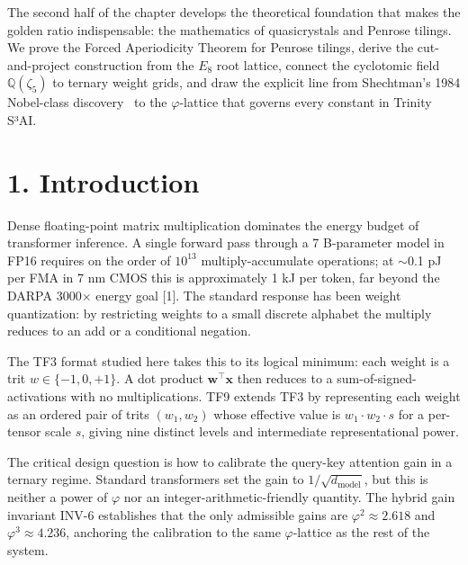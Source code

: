 The second half of the chapter develops the
theoretical foundation that makes the golden
ratio indispensable: the mathematics of
quasicrystals and Penrose tilings. We prove the
Forced Aperiodicity Theorem for Penrose tilings,
derive the cut-and-project construction from the
\(E_8\) root lattice, connect the cyclotomic
field \(\mathbb{Q}(\zeta_5)\) to ternary weight
grids, and draw the explicit line from Shechtman's
1984 Nobel-class discovery~\cite{shechtman1984}
to the \(\varphi\)-lattice that governs every
constant in Trinity S³AI.

\section{1. Introduction}\label{introduction}

Dense floating-point matrix multiplication
dominates the energy budget of transformer
inference. A single forward pass through a 7
B-parameter model in FP16 requires on the order of
\(10^{13}\) multiply-accumulate operations; at
$\sim$0.1 pJ per FMA in 7 nm CMOS this is
approximately 1 kJ per token, far beyond the DARPA
3000$\times$ energy goal [1]. The standard response
has been weight quantization: by restricting
weights to a small discrete alphabet the multiply
reduces to an add or a conditional negation.

The TF3 format studied here takes this to its
logical minimum: each weight is a trit
\(w \in \{-1, 0, +1\}\). A dot product
\(\mathbf{w}^\top \mathbf{x}\) then reduces to a
sum-of-signed-activations with no multiplications.
TF9 extends TF3 by representing each weight as an
ordered pair of trits \((w_1, w_2)\) whose
effective value is \(w_1 \cdot w_2 \cdot s\) for a
per-tensor scale \(s\), giving nine distinct
levels and intermediate representational power.

The critical design question is how to calibrate
the query-key attention gain in a ternary regime.
Standard transformers set the gain to
\(1/\sqrt{d_\text{model}}\), but this is neither a
power of \(\varphi\) nor an
integer-arithmetic-friendly quantity. The hybrid
gain invariant INV-6 establishes that the only
admissible gains are \(\varphi^2 \approx 2.618\)
and \(\varphi^3 \approx 4.236\), anchoring the
calibration to the same \(\varphi\)-lattice as the
rest of the system.


